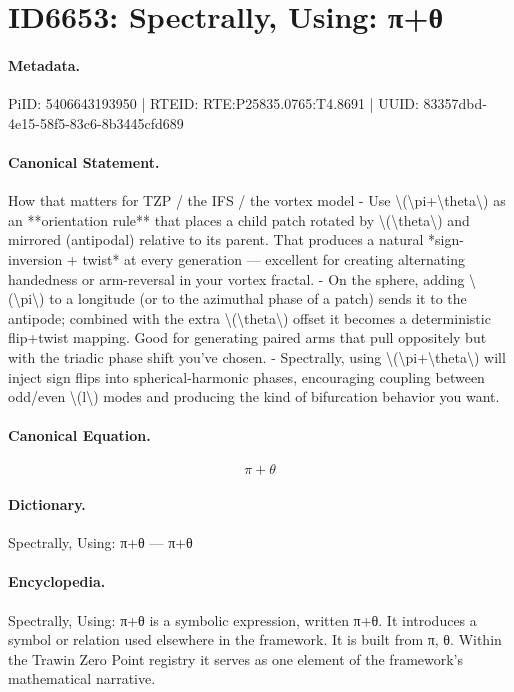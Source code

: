 \section*{ID6653: Spectrally, Using: π+θ}
\paragraph{Metadata.}
PiID: 5406643193950 | RTEID: RTE:P25835.0765:T4.8691 | UUID: 83357dbd-4e15-58f5-83c6-8b3445cfd689

\paragraph{Canonical Statement.}
How that matters for TZP / the IFS / the vortex model - Use \textbackslash{}(\textbackslash{}pi+\textbackslash{}theta\textbackslash{}) as an **orientation rule** that places a child patch rotated by \textbackslash{}(\textbackslash{}theta\textbackslash{}) and mirrored (antipodal) relative to its parent. That produces a natural *sign-inversion + twist* at every generation — excellent for creating alternating handedness or arm-reversal in your vortex fractal. - On the sphere, adding \textbackslash{}(\textbackslash{}pi\textbackslash{}) to a longitude (or to the azimuthal phase of a patch) sends it to the antipode; combined with the extra \textbackslash{}(\textbackslash{}theta\textbackslash{}) offset it becomes a deterministic flip+twist mapping. Good for generating paired arms that pull oppositely but with the triadic phase shift you’ve chosen. - Spectrally, using \textbackslash{}(\textbackslash{}pi+\textbackslash{}theta\textbackslash{}) will inject sign flips into spherical-harmonic phases, encouraging coupling between odd/even \textbackslash{}(l\textbackslash{}) modes and producing the kind of bifurcation behavior you want.

\paragraph{Canonical Equation.}
\[
\pi+\theta
\]

\paragraph{Dictionary.}
Spectrally, Using: π+θ — π+θ

\paragraph{Encyclopedia.}
Spectrally, Using: π+θ is a symbolic expression, written π+θ. It introduces a symbol or relation used elsewhere in the framework. It is built from π, θ. Within the Trawin Zero Point registry it serves as one element of the framework's mathematical narrative.
